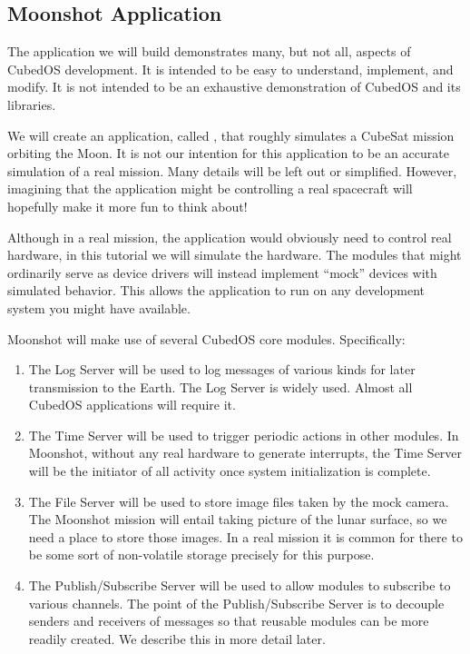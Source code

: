 \subsection{Moonshot Application}
\label{sec:manual-tutorial-moonshot}

The application we will build demonstrates many, but not all, aspects of CubedOS development. It
is intended to be easy to understand, implement, and modify. It is not intended to be an
exhaustive demonstration of CubedOS and its libraries.

We will create an application, called , that roughly simulates a CubeSat
mission orbiting the Moon. It is not our intention for this application to be an accurate
simulation of a real mission. Many details will be left out or simplified. However, imagining
that the application might be controlling a real spacecraft will hopefully make it more fun to
think about!

Although in a real mission, the application would obviously need to control real hardware, in
this tutorial we will simulate the hardware. The modules that might ordinarily serve as device
drivers will instead implement ``mock'' devices with simulated behavior. This allows the
application to run on any development system you might have available.

Moonshot will make use of several CubedOS core modules. Specifically:
\begin{enumerate}
  \item The Log Server will be used to log messages of various kinds for later transmission to
  the Earth. The Log Server is widely used. Almost all CubedOS applications will require it.

  \item The Time Server will be used to trigger periodic actions in other modules. In Moonshot,
  without any real hardware to generate interrupts, the Time Server will be the initiator of all
  activity once system initialization is complete.

  \item The File Server will be used to store image files taken by the mock camera. The Moonshot
  mission will entail taking picture of the lunar surface, so we need a place to store those
  images. In a real mission it is common for there to be some sort of non-volatile storage
  precisely for this purpose.

  \item The Publish/Subscribe Server will be used to allow modules to subscribe to various
  channels. The point of the Publish/Subscribe Server is to decouple senders and receivers of
  messages so that reusable modules can be more readily created. We describe this in more detail
  later.
\end{enumerate}

